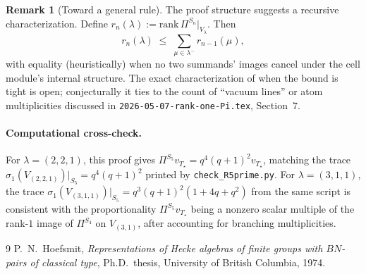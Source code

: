 \documentclass[11pt]{article}
\theoremstyle{definition}
\newtheorem{remark}[theorem]{Remark}
\newcommand{\Pis}[1]{\Pi^{S_{#1}}}
\begin{document}
\begin{remark}[Toward a general rule]
The proof structure suggests a recursive characterization. Define
$r_n(\lambda) := \mathrm{rank}\,\Pis{n}|_{V_\lambda}$. Then
\[
r_n(\lambda) \;\le\; \sum_{\mu \in \lambda^-} r_{n-1}(\mu),
\]
with equality (heuristically) when no two summands' images cancel under
the cell module's internal structure. The exact characterization of
when the bound is tight is open; conjecturally it ties to the count of
``vacuum lines'' or atom multiplicities discussed in
\texttt{2026-05-07-rank-one-Pi.tex}, Section~7.
\end{remark}

\paragraph{Computational cross-check.}
For $\lambda = (2,2,1)$, this proof gives $\Pis{5} v_{T_\star} = q^4(q+1)^2 v_{T_\star}$,
matching the trace $\sigma_1(V_{(2,2,1)})|_{S_5} = q^4(q+1)^2$ printed by
\texttt{check\_R5prime.py}. For $\lambda = (3,1,1)$, the trace
$\sigma_1(V_{(3,1,1)})|_{S_5} = q^3(q+1)^2(1+4q+q^2)$ from the same script
is consistent with the proportionality
$\Pis{5} v_{T_\star}$ being a nonzero scalar multiple of the rank-$1$
image of $\Pis{4}$ on $V_{(3,1)}$, after accounting for branching
multiplicities.

\begin{thebibliography}{9}
P.~N.~Hoefsmit,
\emph{Representations of Hecke algebras of finite groups with $BN$-pairs of classical type},
Ph.D.\ thesis, University of British Columbia, 1974.
\end{thebibliography}
\end{document}
